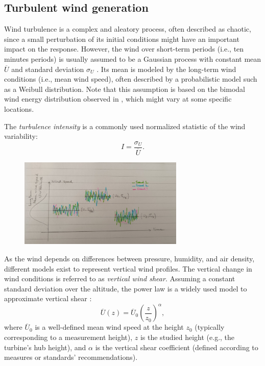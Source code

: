 \subsection{Turbulent wind generation}\label{sec:221}

Wind turbulence is a complex and aleatory process, often described as chaotic, since a small perturbation of its initial conditions might have an important impact on the response. 
However, the wind over short-term periods (i.e., ten minutes periods) is usually assumed to be a Gaussian process with constant mean $\overline{U}$ and standard deviation $\sigma_U$ \citep{burton_2021_wind_handbook}. 
Its mean is modeled by the long-term wind conditions (i.e., mean wind speed), often described by a probabilistic model such as a Weibull distribution. 
Note that this assumption is based on the bimodal wind energy distribution observed in , which might vary at some specific locations. 

The \textit{turbulence intensity} is a commonly used normalized statistic of the wind variability: 
\begin{equation}
    I = \frac{\sigma_U}{\overline{U}}.
\end{equation}

\begin{figure}
    \centering
    \includegraphics[width=0.7\textwidth]{./part1/figures/wind_long_short_term.jpg}
    \label{fig:wind_long_short_term}
    \caption{}
\end{figure}

As the wind depends on differences between pressure, humidity, and air density, different models exist to represent vertical wind profiles. 
The vertical change in wind conditions is referred to as \textit{vertical wind shear}. 
Assuming a constant standard deviation over the altitude, the power law is a widely used model to approximate vertical shear \citep{iec_2019}:
\begin{equation}
    \overline{U}(z) = \overline{U}_0 \left(\frac{z}{z_{\mathrm{0}}}\right)^\alpha,
\end{equation}
where $\overline{U}_0$ is a well-defined mean wind speed at the height $z_{\mathrm{0}}$ (typically corresponding to a measurement height), 
$z$ is the studied height (e.g., the turbine's hub height), and $\alpha$ is the vertical shear coefficient (defined according to measures or standards' recommendations). 

